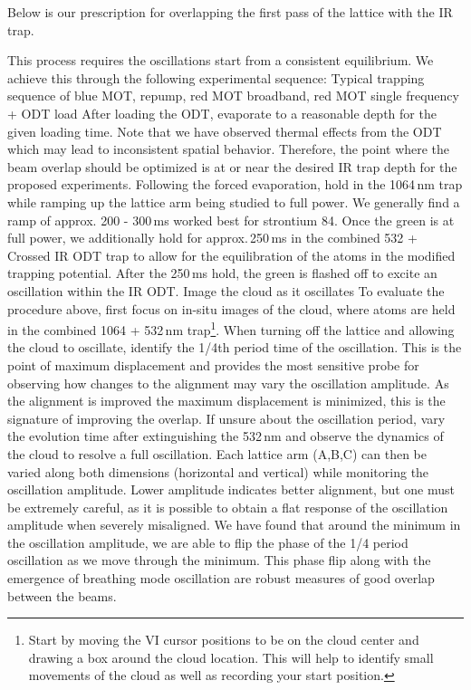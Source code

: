 Below is our prescription for overlapping the first pass of the lattice with the IR trap.
\begin{outline}[enumerate]
\1 This process requires the oscillations start from a consistent equilibrium.
We achieve this through the following experimental sequence:
	\2 Typical trapping sequence of blue MOT, repump, red MOT broadband, red MOT single frequency + ODT load
	\2 After loading the ODT, evaporate to a reasonable depth for the given loading time.
	Note that we have observed thermal effects from the ODT which may lead to inconsistent spatial behavior.
	Therefore, the point where the beam overlap should be optimized is at or near the desired IR trap depth for the proposed experiments.
	\2 Following the forced evaporation, hold in the 1064\,nm trap while ramping up the lattice arm being studied to full power.
	We generally find a ramp of approx. 200 - 300\,ms worked best for strontium 84. 
	\2 Once the green is at full power, we additionally hold for approx.\,250\,ms in the combined 532 + Crossed IR ODT trap to allow for the equilibration of the atoms in the modified trapping potential.
	\2 After the 250\,ms hold, the green is flashed off to excite an oscillation within the IR ODT.
	\2 Image the cloud as it oscillates
\1 To evaluate the procedure above, first focus on in-situ images of the cloud, where atoms are held in the combined 1064 + 532\,nm trap\footnote{
Start by moving the VI cursor positions to be on the cloud center and drawing a box around the cloud location.
This will help to identify small movements of the cloud as well as recording your start position.}.  
\1 When turning off the lattice and allowing the cloud to oscillate, identify the 1/4th period time of the oscillation. 
This is the point of maximum displacement and provides the most sensitive probe for observing how changes to the alignment may vary the oscillation amplitude.
As the alignment is improved the maximum displacement is minimized, this is the signature of improving the overlap.
If unsure about the oscillation period, vary the evolution time after extinguishing the 532\,nm and observe the dynamics of the cloud to resolve a full oscillation.
\1 Each lattice arm (A,B,C) can then be varied along both dimensions (horizontal and vertical) while monitoring the oscillation amplitude. 
Lower amplitude indicates better alignment, but one must be extremely careful, as it is possible to obtain a flat response of the oscillation amplitude when severely misaligned.
We have found that around the minimum in the oscillation amplitude, we are able to flip the phase of the 1/4 period oscillation as we move through the minimum.
This phase flip along with the emergence of breathing mode oscillation are robust measures of good overlap between the beams.
\end{outline}

